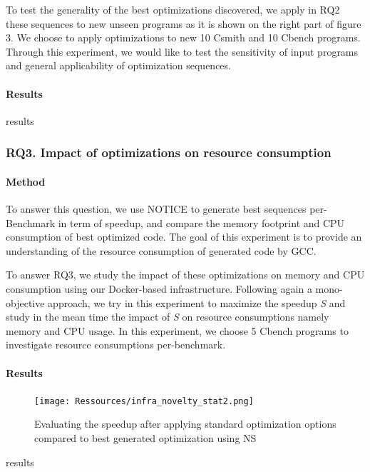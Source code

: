 To test the generality of the best optimizations discovered, we apply in RQ2 these sequences to new unseen programs as it is shown on the right part of figure 3. We choose to apply optimizations to new 10 Csmith and 10 Cbench programs. Through this experiment, we would like to test the sensitivity of input programs and general applicability of optimization sequences.
\paragraph{Results}
results

\noindent{}
\subsubsection{RQ3. Impact of optimizations on resource consumption}
\paragraph{Method}
To answer this question, we use NOTICE to generate best sequences per-Benchmark in term of speedup, and compare the memory footprint and CPU consumption of best optimized code. The goal of this experiment is to provide an understanding of the resource consumption of generated code by GCC. 




To answer RQ3, we study the impact of these optimizations on memory and CPU consumption using our Docker-based infrastructure. Following again a mono-objective approach, we try in this experiment to maximize the speedup \textit{S} and study in the mean time the impact of \textit{S} on resource consumptions namely memory and CPU usage. In this experiment, we choose 5 Cbench programs to investigate resource consumptions per-benchmark.
\paragraph{Results}

\begin{figure}[h]
	\centering
	\texttt{[image: Ressources/infra\_novelty\_stat2.png]}
	\caption{Evaluating the speedup after applying standard optimization options compared to best generated optimization using NS}
\end{figure}
results

\noindent{}
